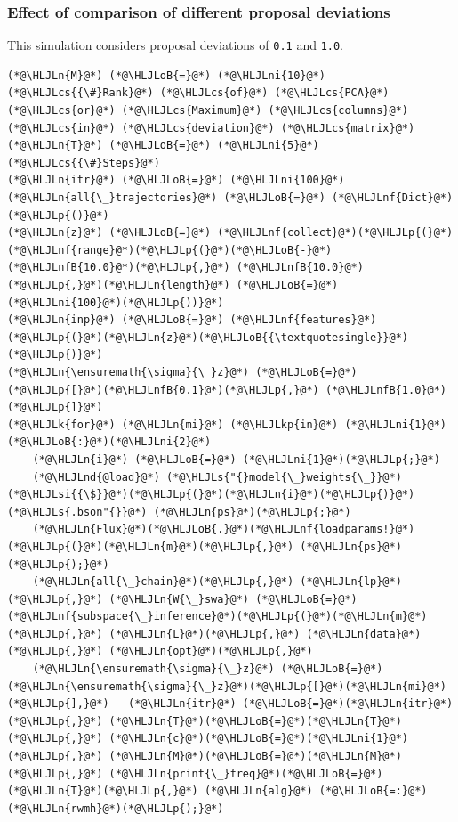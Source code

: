 \documentclass[12pt,a4paper]{article}
\newcommand{\HLJLk}[1]{\textcolor[RGB]{148,91,176}{\textbf{#1}}}
\newcommand{\HLJLkp}[1]{\textcolor[RGB]{148,91,176}{\textbf{#1}}}
\newcommand{\HLJLn}[1]{#1}
\newcommand{\HLJLnd}[1]{\textcolor[RGB]{214,102,97}{#1}}
\newcommand{\HLJLnf}[1]{\textcolor[RGB]{66,102,213}{#1}}
\newcommand{\HLJLs}[1]{\textcolor[RGB]{201,61,57}{#1}}
\newcommand{\HLJLsi}[1]{#1}
\newcommand{\HLJLnfB}[1]{\textcolor[RGB]{59,151,46}{#1}}
\newcommand{\HLJLni}[1]{\textcolor[RGB]{59,151,46}{#1}}
\newcommand{\HLJLoB}[1]{\textcolor[RGB]{102,102,102}{\textbf{#1}}}
\newcommand{\HLJLp}[1]{#1}
\newcommand{\HLJLcs}[1]{\textcolor[RGB]{153,153,119}{\textit{#1}}}
\begin{document}
\subsubsection{Effect of comparison of different proposal deviations}
This simulation considers proposal deviations of \texttt{0.1} and \texttt{1.0}.


\begin{lstlisting}
(*@\HLJLn{M}@*) (*@\HLJLoB{=}@*) (*@\HLJLni{10}@*) (*@\HLJLcs{{\#}Rank}@*) (*@\HLJLcs{of}@*) (*@\HLJLcs{PCA}@*) (*@\HLJLcs{or}@*) (*@\HLJLcs{Maximum}@*) (*@\HLJLcs{columns}@*) (*@\HLJLcs{in}@*) (*@\HLJLcs{deviation}@*) (*@\HLJLcs{matrix}@*)
(*@\HLJLn{T}@*) (*@\HLJLoB{=}@*) (*@\HLJLni{5}@*) (*@\HLJLcs{{\#}Steps}@*)
(*@\HLJLn{itr}@*) (*@\HLJLoB{=}@*) (*@\HLJLni{100}@*)
(*@\HLJLn{all{\_}trajectories}@*) (*@\HLJLoB{=}@*) (*@\HLJLnf{Dict}@*)(*@\HLJLp{()}@*)
(*@\HLJLn{z}@*) (*@\HLJLoB{=}@*) (*@\HLJLnf{collect}@*)(*@\HLJLp{(}@*)(*@\HLJLnf{range}@*)(*@\HLJLp{(}@*)(*@\HLJLoB{-}@*)(*@\HLJLnfB{10.0}@*)(*@\HLJLp{,}@*) (*@\HLJLnfB{10.0}@*)(*@\HLJLp{,}@*)(*@\HLJLn{length}@*) (*@\HLJLoB{=}@*) (*@\HLJLni{100}@*)(*@\HLJLp{))}@*)
(*@\HLJLn{inp}@*) (*@\HLJLoB{=}@*) (*@\HLJLnf{features}@*)(*@\HLJLp{(}@*)(*@\HLJLn{z}@*)(*@\HLJLoB{{\textquotesingle}}@*)(*@\HLJLp{)}@*)
(*@\HLJLn{\ensuremath{\sigma}{\_}z}@*) (*@\HLJLoB{=}@*) (*@\HLJLp{[}@*)(*@\HLJLnfB{0.1}@*)(*@\HLJLp{,}@*) (*@\HLJLnfB{1.0}@*)(*@\HLJLp{]}@*)
(*@\HLJLk{for}@*) (*@\HLJLn{mi}@*) (*@\HLJLkp{in}@*) (*@\HLJLni{1}@*)(*@\HLJLoB{:}@*)(*@\HLJLni{2}@*)
    (*@\HLJLn{i}@*) (*@\HLJLoB{=}@*) (*@\HLJLni{1}@*)(*@\HLJLp{;}@*)
    (*@\HLJLnd{@load}@*) (*@\HLJLs{"{}model{\_}weights{\_}}@*)(*@\HLJLsi{{\$}}@*)(*@\HLJLp{(}@*)(*@\HLJLn{i}@*)(*@\HLJLp{)}@*)(*@\HLJLs{.bson"{}}@*) (*@\HLJLn{ps}@*)(*@\HLJLp{;}@*)
    (*@\HLJLn{Flux}@*)(*@\HLJLoB{.}@*)(*@\HLJLnf{loadparams!}@*)(*@\HLJLp{(}@*)(*@\HLJLn{m}@*)(*@\HLJLp{,}@*) (*@\HLJLn{ps}@*)(*@\HLJLp{);}@*)
    (*@\HLJLn{all{\_}chain}@*)(*@\HLJLp{,}@*) (*@\HLJLn{lp}@*)(*@\HLJLp{,}@*) (*@\HLJLn{W{\_}swa}@*) (*@\HLJLoB{=}@*) (*@\HLJLnf{subspace{\_}inference}@*)(*@\HLJLp{(}@*)(*@\HLJLn{m}@*)(*@\HLJLp{,}@*) (*@\HLJLn{L}@*)(*@\HLJLp{,}@*) (*@\HLJLn{data}@*)(*@\HLJLp{,}@*) (*@\HLJLn{opt}@*)(*@\HLJLp{,}@*)
	(*@\HLJLn{\ensuremath{\sigma}{\_}z}@*) (*@\HLJLoB{=}@*) (*@\HLJLn{\ensuremath{\sigma}{\_}z}@*)(*@\HLJLp{[}@*)(*@\HLJLn{mi}@*)(*@\HLJLp{],}@*)	(*@\HLJLn{itr}@*) (*@\HLJLoB{=}@*)(*@\HLJLn{itr}@*)(*@\HLJLp{,}@*) (*@\HLJLn{T}@*)(*@\HLJLoB{=}@*)(*@\HLJLn{T}@*)(*@\HLJLp{,}@*) (*@\HLJLn{c}@*)(*@\HLJLoB{=}@*)(*@\HLJLni{1}@*)(*@\HLJLp{,}@*) (*@\HLJLn{M}@*)(*@\HLJLoB{=}@*)(*@\HLJLn{M}@*)(*@\HLJLp{,}@*) (*@\HLJLn{print{\_}freq}@*)(*@\HLJLoB{=}@*)(*@\HLJLn{T}@*)(*@\HLJLp{,}@*) (*@\HLJLn{alg}@*) (*@\HLJLoB{=:}@*)(*@\HLJLn{rwmh}@*)(*@\HLJLp{);}@*)    
    

\end{lstlisting}
\end{document}
